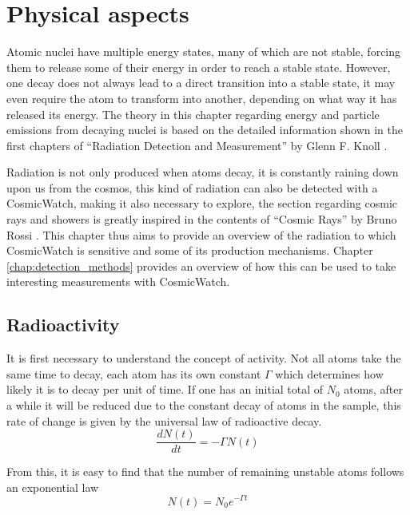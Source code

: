 \chapter{Physical aspects}

Atomic nuclei have multiple energy states, many of which are not stable, forcing them to release some of their energy in order to reach a stable state. However, one decay does not always lead to a direct transition into a stable state, it may even require the atom to transform into another, depending on what way it has released its energy. The theory in this chapter regarding energy and particle emissions from decaying nuclei is based on the detailed information shown in the first chapters of ``Radiation Detection and Measurement'' by Glenn F. Knoll \cite{knoll2010radiation}. 

Radiation is not only produced when atoms decay, it is constantly raining down upon us from the cosmos, this kind of radiation can also be detected with a CosmicWatch, making it also necessary to explore, the section regarding cosmic rays and showers is greatly inspired in the contents of ``Cosmic Rays'' by Bruno Rossi \cite{brunoRossi}. This chapter thus aims to provide an overview of the radiation to which CosmicWatch is sensitive and some of its production mechanisms. Chapter \ref{chap:detection_methods} provides an overview of how this can be used to take interesting measurements with CosmicWatch.

\section{Radioactivity}

It is first necessary to understand the concept of activity. Not all atoms take the same time to decay, each atom has its own constant $\Gamma$ which determines how likely it is to decay per unit of time. If one has an initial total of $N_0$ atoms, after a while it will be reduced due to the constant decay of atoms in the sample, this rate of change is given by the universal law of radioactive decay.
\begin{equation}
    \frac{dN(t)}{dt} = -\Gamma N(t)
\end{equation}

From this, it is easy to find that the number of remaining unstable atoms follows an exponential law
\begin{equation}
    N(t) = N_0 e^{-\Gamma t}
\end{equation}

